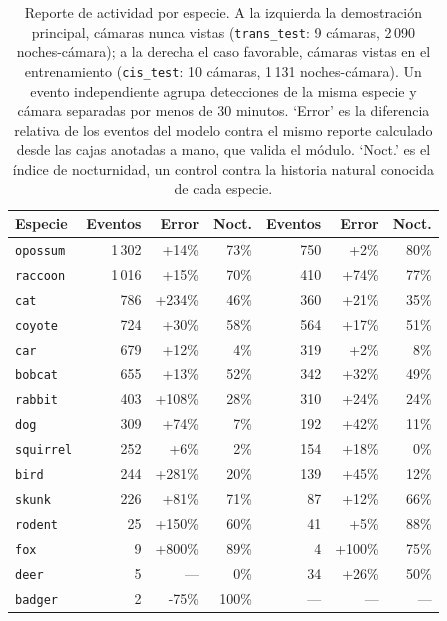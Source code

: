 \begin{table}[t]
  \centering
  \scriptsize
  \begin{tabular}{lrrr|rrr}
    \toprule
    Especie & Eventos & Error & Noct. & Eventos & Error & Noct. \\
    \midrule
    \texttt{opossum} & 1\,302 & +14\% & 73\% & 750 & +2\% & 80\% \\
    \texttt{raccoon} & 1\,016 & +15\% & 70\% & 410 & +74\% & 77\% \\
    \texttt{cat} & 786 & +234\% & 46\% & 360 & +21\% & 35\% \\
    \texttt{coyote} & 724 & +30\% & 58\% & 564 & +17\% & 51\% \\
    \texttt{car} & 679 & +12\% & 4\% & 319 & +2\% & 8\% \\
    \texttt{bobcat} & 655 & +13\% & 52\% & 342 & +32\% & 49\% \\
    \texttt{rabbit} & 403 & +108\% & 28\% & 310 & +24\% & 24\% \\
    \texttt{dog} & 309 & +74\% & 7\% & 192 & +42\% & 11\% \\
    \texttt{squirrel} & 252 & +6\% & 2\% & 154 & +18\% & 0\% \\
    \texttt{bird} & 244 & +281\% & 20\% & 139 & +45\% & 12\% \\
    \texttt{skunk} & 226 & +81\% & 71\% & 87 & +12\% & 66\% \\
    \texttt{rodent} & 25 & +150\% & 60\% & 41 & +5\% & 88\% \\
    \texttt{fox} & 9 & +800\% & 89\% & 4 & +100\% & 75\% \\
    \texttt{deer} & 5 & --- & 0\% & 34 & +26\% & 50\% \\
    \texttt{badger} & 2 & -75\% & 100\% & --- & --- & --- \\
    \bottomrule
  \end{tabular}
  \caption{Reporte de actividad por especie. A la izquierda la demostración principal, cámaras nunca vistas (\texttt{trans\_test}: 9 cámaras, 2\,090 noches-cámara); a la derecha el caso favorable, cámaras vistas en el entrenamiento (\texttt{cis\_test}: 10 cámaras, 1\,131 noches-cámara). Un evento independiente agrupa detecciones de la misma especie y cámara separadas por menos de 30 minutos. `Error' es la diferencia relativa de los eventos del modelo contra el mismo reporte calculado desde las cajas anotadas a mano, que valida el módulo. `Noct.' es el índice de nocturnidad, un control contra la historia natural conocida de cada especie.}
  \label{tab:actividad}
\end{table}
